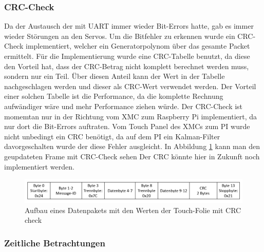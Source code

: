 \documentclass[12pt,a4paper,bibliography=totoc,listof=totoc]{scrartcl}
\begin{document}
\subsubsection{CRC-Check}
Da der Austausch der mit UART immer wieder Bit-Errors hatte, gab es immer wieder Störungen an den Servos.
Um die Bitfehler zu erkennen wurde ein CRC-Check implementiert, welcher ein Generatorpolynom über das
gesamte Packet ermittelt. Für die Implementierung wurde eine CRC-Tabelle benutzt, da diese den Vorteil hat,
dass der CRC-Betrag nicht komplett berechnet werden muss, sondern nur ein Teil. Über diesen Anteil kann 
der Wert in der Tabelle nachgeschlagen werden und dieser als CRC-Wert verwendet werden. Der Vorteil einer solchen
Tabelle ist die Performance, da die komplette Rechnung aufwändiger wäre und mehr Performance ziehen würde. Der CRC-Check ist momemtan nur in
der Richtung vom XMC zum Raspberry Pi implementiert, da nur dort die Bit-Errors auftraten. Vom Touch Panel des XMCs zum PI wurde nicht unbedingt ein CRC benötigt,
da auf dem PI ein Kalman-Filter davorgeschalten wurde der diese Fehler ausgleicht. 
In Abbildung \ref{fig:UARTFrameCRC} kann man den geupdateten Frame mit CRC-Check sehen
Der CRC könnte hier in Zukunft noch implementiert werden.
\begin{figure}[htbp]
	\centering
	\includegraphics[scale = 0.5]{pics/Uartplattecrc.png}
	\caption{Aufbau eines Datenpakets mit den Werten der Touch-Folie mit CRC check}
	\label{fig:UARTFrameCRC}
\end{figure}
\subsubsection {Zeitliche Betrachtungen}
\end{document}
